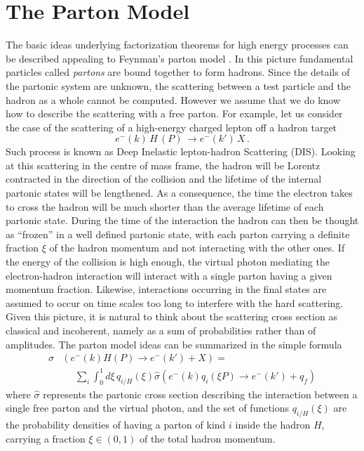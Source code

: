 \section{The Parton Model}
\label{sec:parton_model}
The basic ideas underlying factorization theorems for high energy processes can 
be described appealing to Feynman's parton model \cite{PhysRevLett.23.1415,Feynman:1973xc, Bjorken:1969ja}.
In this picture fundamental particles called \textit{partons} are bound together to form hadrons.
Since the details of the partonic system are unknown, the scattering between a test particle and the hadron 
as a whole cannot be computed. However we assume that we do know how to describe the scattering with a free parton.
%
For example, let us consider the case of the scattering of a high-energy charged lepton off a
hadron target 
$$e^{-}(k)\,H\,(P)\,\rightarrow e^{-}(k')\,X \,. $$ 
Such process is known as Deep Inelastic lepton-hadron Scattering (DIS).
Looking at this scattering in the centre of mass frame, the hadron will be Lorentz contracted 
in the direction of the collision and the lifetime of the internal partonic states will be lengthened.
As a consequence, the time the electron takes to cross the hadron will be much shorter than the average lifetime of
each partonic state. During the time of the interaction the hadron can then be thought as ``frozen'' in 
a well defined partonic state, with each parton carrying a definite fraction $\xi$ of the hadron momentum
and not interacting with the other ones. 
If the energy of the collision is high enough, the virtual photon mediating the electron-hadron 
interaction will interact with a single parton having a given momentum fraction. Likewise, interactions
occurring in the final states are assumed to occur on time scales too long to interfere with the hard scattering.
%
Given this picture, it is natural to think about the scattering cross section as classical and incoherent,
namely as a sum of probabilities rather than of amplitudes. The parton model ideas can be summarized in the simple formula
\begin{align}
    \label{eq:parton_model}
    \sigma&\left(e^{-}\left(k\right)H\left(P\right)\rightarrow e^{-}\left(k'\right)+X\right) = \nonumber\\
     &\,\,\,\,\,\,\,\,\sum_i\int_0^1 d\xi\, q_{i/H}\left(\xi\right)
     \hat{\sigma}\left(e^{-}\left(k\right)q_i\left(\xi P\right)\rightarrow e^{-}\left(k'\right)+q_f\right)
\end{align}
where $\hat{\sigma}$ represents the partonic cross section describing the interaction between 
a single free parton and the virtual photon, and the set of functions $q_{i/H}\left(\xi\right)$ are the probability densities
of having a parton of kind $i$ inside the hadron $H$, carrying a fraction $\xi \in \left(0,1\right)$ of the total hadron momentum.

